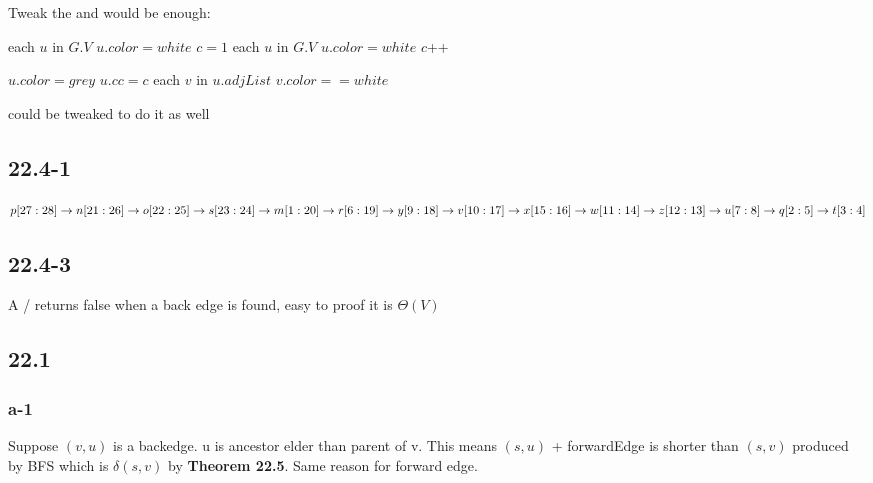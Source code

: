 \documentclass[]{article}
\begin{document}
Tweak the  and  would be enough:

\begin{codebox}
	
	\li	\For each $u$ in $G.V$
	\li \Do $u.color = white$
	\End
	\li $c=1$
	\li	\For each $u$ in $G.V$
	\li \Do \If $u.color = white$
	\li \Then {}
	\li $c$++
	\End
	\End
	
\end{codebox}

\begin{codebox}
	
	\li $u.color = grey$
	\li $u.cc = c$
	\li	\For each $v$ in $u.adjList$
	\li \Do \If $v.color == white$
	\li 	\Then {}
	\End
	\End
	
\end{codebox}

 could be tweaked to do it as well

\subsection{22.4-1}

$ p[27:28] \rightarrow n[21:26] \rightarrow o[22:25] \rightarrow s[23:24] \rightarrow\\
 m[1:20] \rightarrow r[6:19] \rightarrow y[9:18] \rightarrow v[10:17] \rightarrow x[15:16] \rightarrow \\
w[11:14] \rightarrow z[12:13] \rightarrow u[7:8] \rightarrow q[2:5] \rightarrow t[3:4]$

\subsection{22.4-3}
A / returns false when a back edge is found, easy to proof it is $\Theta (V)$

\subsection{22.1}
\subsubsection{a-1}

Suppose $(v,u)$ is a backedge. u is ancestor elder than parent of v. This means $(s,u)$ + forwardEdge is shorter than $(s,v)$ produced by BFS which is $\delta(s,v)$ by \textbf{Theorem 22.5}. Same reason for forward edge.   
\end{document}
